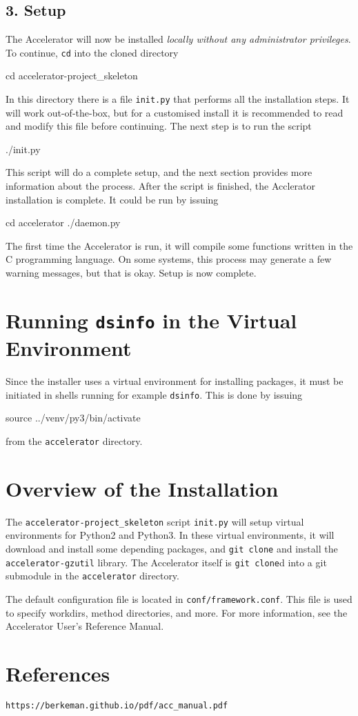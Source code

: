 \documentclass[a4paper]{article}
\begin{document}
\subsection*{3. Setup}
The Accelerator will now be installed \textsl{locally without any
administrator privileges}.  To continue, \texttt{cd} into the cloned
directory
\begin{shell}
cd accelerator-project_skeleton
\end{shell}
In this directory there is a file \texttt{init.py} that performs all
the installation steps.  It will work out-of-the-box, but for a
customised install it is recommended to read and modify this file
before continuing.  The next step is to run the script
\begin{shell}
./init.py
\end{shell}
This script will do a complete setup, and the next section provides
more information about the process.  After the script is finished, the
Acclerator installation is complete.  It could be run by issuing
\begin{shell}
cd accelerator
./daemon.py  
\end{shell}
The first time the Accelerator is run, it will compile some functions
written in the C programming language.  On some systems, this process
may generate a few warning messages, but that is okay.  Setup is now
complete.  \thispagestyle{empty}

\section{Running \texttt{dsinfo} in the Virtual Environment}
Since the installer uses a virtual environment for installing
packages, it must be initiated in shells running for example
\texttt{dsinfo}.  This is done by issuing
\begin{shell}
source ../venv/py3/bin/activate
\end{shell}
from the \texttt{accelerator} directory.


\section*{Overview of the Installation}
The \texttt{accelerator-project\_skeleton} script \texttt{init.py}
will setup virtual environments for Python2 and Python3.  In these
virtual environments, it will download and install some depending
packages, and \texttt{git clone} and install the
\texttt{accelerator-gzutil} library.  The Accelerator itself is
\texttt{git clone}d into a git submodule in the \texttt{accelerator}
directory.

The default configuration file is located in
\texttt{conf/framework.conf}.  This file is used to specify workdirs,
method directories, and more.  For more information, see the
Accelerator User's Reference Manual.



\section*{References}
\texttt{https://berkeman.github.io/pdf/acc\_manual.pdf}
\end{document}
